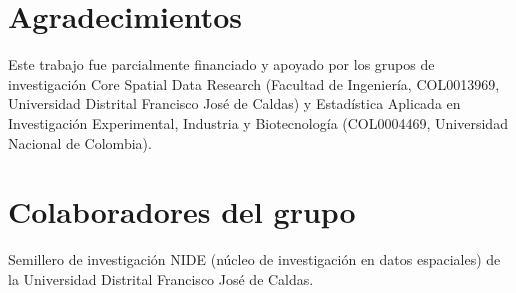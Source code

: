 \documentclass[a4paper,fleqn]{cas-sc}
\numberwithin{equation}{section}
\begin{document}
\section*{Agradecimientos}

Este trabajo fue parcialmente financiado y apoyado por los grupos de
investigaci\'on Core Spatial Data Research (Facultad de Ingenier\'ia,
COL0013969, Universidad Distrital Francisco Jos\'e de Caldas) y
Estad\'istica Aplicada en Investigaci\'on Experimental, Industria y
Biotecnolog\'ia (COL0004469, Universidad Nacional de Colombia).

\section*{Colaboradores del grupo}

Semillero de investigaci\'on NIDE (n\'ucleo de investigaci\'on en datos
espaciales) de la Universidad Distrital Francisco Jos\'e de Caldas.

\end{document}
